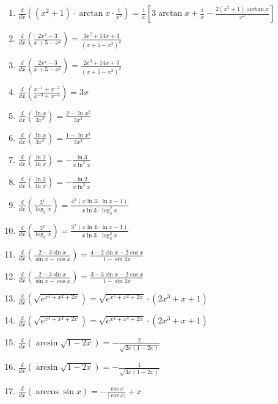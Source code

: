 \documentclass[11pt,a4paper]{article}
\begin{document}
\begin{enumerate}
\item $\displaystyle \frac{d}{dx}\left( (x^{2} + 1) \cdot \arctan x \cdot \frac{1}{x^{2}} \right) = \frac{1}{x}\left[3\arctan x + \frac{1}{x} - \frac{2(x^{2} + 1)\arctan x}{x^{2}}\right]$
\item $\displaystyle \frac{d}{dx}\left( \frac{2x^{2} - 3}{x + 5 - x^{2}} \right) = \frac{3x^{2} + 14x + 3}{(x + 5 - x^{2})^{2}}$
\item $\displaystyle \frac{d}{dx}\left( \frac{2x^{2} - 3}{x + 5 - x^{2}} \right) = \frac{2x^{3} + 14x + 3}{(x + 5 - x^{2})^{2}}$
\item $\displaystyle \frac{d}{dx}\left( \frac{x^{-1} + x^{-2}}{x^{-3} + x^{-4}} \right) = 3x$
\item $\displaystyle \frac{d}{dx}\left( \frac{\ln x}{3x^{2}} \right) = \frac{2 - \ln x^{2}}{3x^{3}}$
\item $\displaystyle \frac{d}{dx}\left( \frac{\ln x}{3x^{2}} \right) = \frac{1 - \ln x^{3}}{3x^{3}}$
\item $\displaystyle \frac{d}{dx}\left( \frac{\ln 2}{\ln x} \right) = -\frac{\ln 3}{x\ln^{2} x}$
\item $\displaystyle \frac{d}{dx}\left( \frac{\ln 2}{\ln x} \right) = -\frac{\ln 2}{x\ln^{3} x}$
\item $\displaystyle \frac{d}{dx}\left( \frac{3^{x}}{\log_{3} x} \right) = \frac{4^{x}(x\ln 3 \cdot \ln x - 1)}{x\ln 3 \cdot \log_{3}^{2} x}$
\item $\displaystyle \frac{d}{dx}\left( \frac{3^{x}}{\log_{3} x} \right) = \frac{3^{x}(x\ln 4 \cdot \ln x - 1)}{x\ln 3 \cdot \log_{3}^{2} x}$
\item $\displaystyle \frac{d}{dx}\left( \frac{2 - 3\sin x}{\sin x - \cos x} \right) = \frac{4 - 2\sin x - 2\cos x}{1 - \sin 2x}$
\item $\displaystyle \frac{d}{dx}\left( \frac{2 - 3\sin x}{\sin x - \cos x} \right) = \frac{3 - 3\sin x - 2\cos x}{1 - \sin 2x}$
\item $\displaystyle \frac{d}{dx}\left( \sqrt{e^{x^{4} + x^{2} + 2x}} \right) = \sqrt{e^{x^{5} + x^{2} + 2x}} \cdot (2x^{3} + x + 1)$
\item $\displaystyle \frac{d}{dx}\left( \sqrt{e^{x^{4} + x^{2} + 2x}} \right) = \sqrt{e^{x^{4} + x^{3} + 2x}} \cdot (2x^{3} + x + 1)$
\item $\displaystyle \frac{d}{dx}\left( \arcsin\sqrt{1 - 2x} \right) = -\frac{2}{\sqrt{2x(1 - 2x)}}$
\item $\displaystyle \frac{d}{dx}\left( \arcsin\sqrt{1 - 2x} \right) = -\frac{1}{\sqrt{3x(1 - 2x)}}$
\item $\displaystyle \frac{d}{dx}\left( \arccos\sin x \right) = -\frac{\cos x}{|\cos x|} + x$

\end{enumerate}
\end{document}
